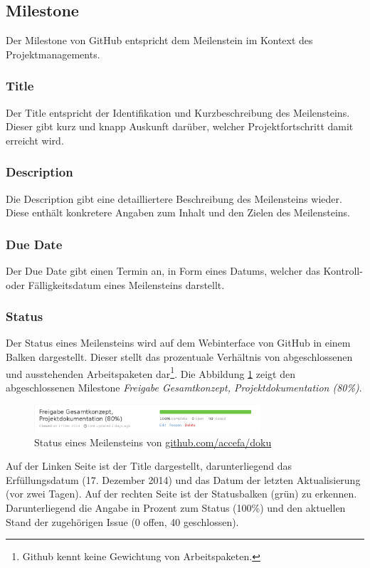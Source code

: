 \subsection{Milestone}
Der \gls{Milestone} von GitHub entspricht dem Meilenstein im Kontext des
Projektmanagements.

\subsubsection{Title}
Der \gls{Title} entspricht der Identifikation und Kurzbeschreibung des
Meilensteins. Dieser gibt kurz und knapp Auskunft darüber, welcher
Projektfortschritt damit erreicht wird.

\subsubsection{Description}
Die \gls{Description} gibt eine detailliertere Beschreibung des Meilensteins
wieder. Diese enthält konkretere Angaben zum Inhalt und den Zielen des
Meilensteins.

\subsubsection{Due Date}
Der \gls{Due Date} gibt einen Termin an, in Form eines Datums, welcher das
Kontroll- oder Fälligkeitsdatum eines Meilensteins darstellt.

\subsubsection{Status}
Der Status eines Meilensteins wird auf dem Webinterface von GitHub in einem
Balken dargestellt. Dieser stellt das prozentuale Verhältnis von
abgeschlossenen und ausstehenden Arbeitspaketen dar\footnote{Github kennt
keine Gewichtung von Arbeitspaketen.}. Die Abbildung
\ref{fig:milestone_progress} zeigt den abgeschlossenen
\gls{Milestone} \emph{Freigabe Gesamtkonzept, Projektdokumentation (80\%)}.
\begin{figure}[h!]
	\centering
	\includegraphics[width=0.75\textwidth]{../../fig/github/milestone_progress.png}
	\caption{Status eines Meilensteins von \url{github.com/accefa/doku}}
	\label{fig:milestone_progress}
\end{figure}

Auf der Linken Seite ist der \gls{Title} dargestellt, darunterliegend das
Erfüllungsdatum (17. Dezember 2014) und das Datum der letzten Aktualisierung
(vor zwei Tagen). Auf der rechten Seite ist der Statusbalken (grün) zu
erkennen. Darunterliegend die Angabe in Prozent zum Status (100\%) und den
aktuellen Stand der zugehörigen \gls{Issue} (0 offen, 40 geschlossen).

